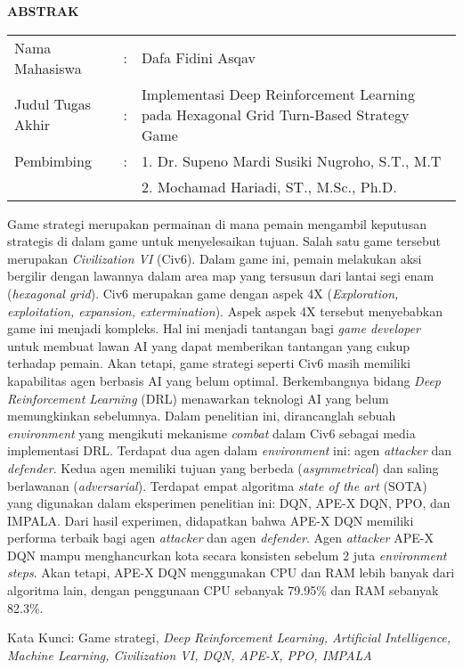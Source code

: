 \begin{center}
  \large\textbf{ABSTRAK}
\end{center}


\vspace{2ex}

\begingroup
  \setlength{\tabcolsep}{0pt}

  \noindent
  \begin{tabularx}{\textwidth}{l >{\centering}m{2em} X}
    Nama Mahasiswa    &:& Dafa Fidini Asqav \\

    Judul Tugas Akhir &:&	Implementasi Deep Reinforcement Learning pada Hexagonal Grid Turn-Based Strategy Game \\

    Pembimbing        &:& 1. Dr. Supeno Mardi Susiki Nugroho, S.T., M.T \\
                      & & 2. Mochamad Hariadi, ST., M.Sc., Ph.D. \\
  \end{tabularx}
\endgroup

Game strategi merupakan permainan di mana pemain mengambil keputusan strategis di dalam game untuk menyelesaikan tujuan. 
Salah satu game tersebut merupakan \emph{Civilization VI} (Civ6).
Dalam game ini, pemain melakukan aksi bergilir dengan lawannya dalam area map yang tersusun dari lantai segi enam (\emph{hexagonal grid}).
Civ6 merupakan game dengan aspek 4X (\emph{Exploration, exploitation, expansion, extermination}). Aspek aspek 4X tersebut menyebabkan game ini menjadi kompleks.
Hal ini menjadi tantangan bagi \emph{game developer} untuk membuat lawan AI yang dapat memberikan tantangan yang cukup terhadap pemain. 
Akan tetapi, game strategi seperti Civ6 masih memiliki kapabilitas agen berbasis AI yang belum optimal.
Berkembangnya bidang \emph{Deep Reinforcement Learning} (DRL) menawarkan teknologi AI yang belum memungkinkan sebelumnya.
Dalam penelitian ini, dirancanglah sebuah \emph{environment} yang mengikuti mekanisme \emph{combat} dalam Civ6
sebagai media implementasi DRL. Terdapat dua agen dalam \emph{environment} ini: agen \emph{attacker} dan \emph{defender}.
Kedua agen memiliki tujuan yang berbeda (\emph{asymmetrical}) dan saling berlawanan (\emph{adversarial}).
Terdapat empat algoritma \emph{state of the art} (SOTA) yang digunakan dalam eksperimen penelitian ini:
DQN, APE-X DQN, PPO, dan IMPALA. Dari hasil experimen, didapatkan bahwa APE-X DQN memiliki performa terbaik bagi agen \emph{attacker}
dan agen \emph{defender}. Agen \emph{attacker} APE-X DQN mampu menghancurkan kota secara konsisten sebelum 2 juta \emph{environment steps}.
Akan tetapi, APE-X DQN menggunakan CPU dan RAM lebih banyak dari algoritma lain, dengan penggunaan CPU sebanyak 79.95\% dan RAM sebanyak 82.3\%.

Kata Kunci: Game strategi, \emph{Deep Reinforcement Learning, Artificial Intelligence, Machine Learning, Civilization VI, DQN, APE-X, PPO, IMPALA}
